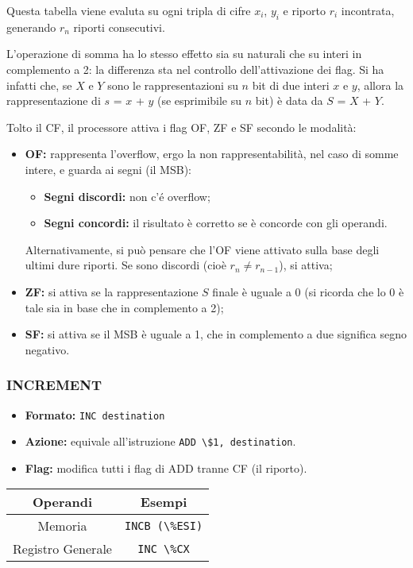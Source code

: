 \documentclass[a4paper,11pt]{article}
\begin{document}
Questa tabella viene evaluta su ogni tripla di cifre $x_i$, $y_i$ e riporto $r_i$ incontrata, generando $r_n$ riporti consecutivi.

L'operazione di somma ha lo stesso effetto sia su naturali che su interi in complemento a 2: la differenza sta nel controllo dell'attivazione dei flag.
Si ha infatti che, se $X$ e $Y$ sono le rappresentazioni su $n$ bit di due interi $x$ e $y$, allora la rappresentazione di $s$ = $x$ + $y$ (se esprimibile su $n$ bit) è data da $S$ = $X$ + $Y$.

Tolto il CF, il processore attiva i flag OF, ZF e SF secondo le modalità:
\begin{itemize}
	\item \textbf{OF:} rappresenta l'overflow, ergo la non rappresentabilità, nel caso di somme intere, e guarda ai segni (il MSB):
	\begin{itemize}
		\item \textbf{Segni discordi:} non c'é overflow;
		\item \textbf{Segni concordi:} il risultato è corretto se è concorde con gli operandi.
	\end{itemize}
	Alternativamente, si può pensare che l'OF viene attivato sulla base degli ultimi dure riporti. Se sono discordi (cioè $r_n \neq r_{n-1}$), si attiva;
	\item \textbf{ZF:} si attiva se la rappresentazione $S$ finale è uguale a 0 (si ricorda che lo 0 è tale sia in base che in complemento a 2);
	\item \textbf{SF:} si attiva se il MSB è uguale a 1, che in complemento a due significa segno negativo.
\end{itemize}

\subsubsection{INCREMENT}
\begin{itemize}
	\item \textbf{Formato:} \lstinline|INC destination|
	\item \textbf{Azione:} equivale all'istruzione \lstinline|ADD \$1, destination|. 
	\item \textbf{Flag:} modifica tutti i flag di ADD tranne CF (il riporto).
\end{itemize}

		\begin{table}[H]
			\center {}
			\begin{tabular} { c | c }
				\bfseries Operandi & \bfseries Esempi \\
				\hline 
				Memoria & \lstinline|INCB (\%ESI)| \\
				Registro Generale & \lstinline|INC \%CX|
			\end{tabular}
		\end{table}
\end{document}
